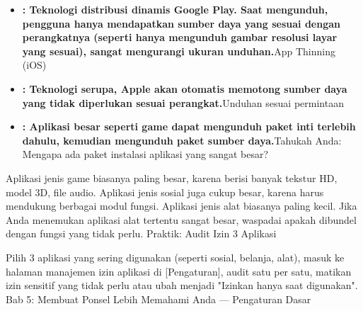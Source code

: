 \begin{itemize}
  \item \textbf{: Teknologi distribusi dinamis Google Play. Saat mengunduh, pengguna hanya mendapatkan sumber daya yang sesuai dengan perangkatnya (seperti hanya mengunduh gambar resolusi layar yang sesuai), sangat mengurangi ukuran unduhan.}App Thinning (iOS)
  \item \textbf{: Teknologi serupa, Apple akan otomatis memotong sumber daya yang tidak diperlukan sesuai perangkat.}Unduhan sesuai permintaan
  \item \textbf{: Aplikasi besar seperti game dapat mengunduh paket inti terlebih dahulu, kemudian mengunduh paket sumber daya.}Tahukah Anda: Mengapa ada paket instalasi aplikasi yang sangat besar?
\end{itemize}

\begin{tcbinfo}{Aplikasi jenis game biasanya paling besar, karena berisi banyak tekstur HD, model 3D, file audio. Aplikasi jenis sosial juga cukup besar, karena harus mendukung berbagai modul fungsi. Aplikasi jenis alat biasanya paling kecil. Jika Anda menemukan aplikasi alat tertentu sangat besar, waspadai apakah dibundel dengan fungsi yang tidak perlu.}
Praktik: Audit Izin 3 Aplikasi

\end{tcbinfo}

\begin{tcbpractice}{Pilih 3 aplikasi yang sering digunakan (seperti sosial, belanja, alat), masuk ke halaman manajemen izin aplikasi di [Pengaturan], audit satu per satu, matikan izin sensitif yang tidak perlu atau ubah menjadi "Izinkan hanya saat digunakan".}
Bab 5: Membuat Ponsel Lebih Memahami Anda — Pengaturan Dasar

\end{tcbpractice}
